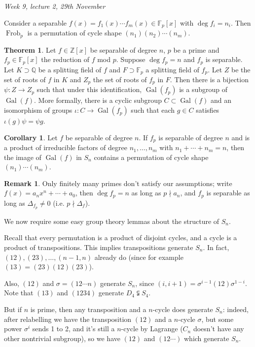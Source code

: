 \documentclass{article}
\newcommand{\F}{\mathbb{F}}
\newcommand{\Z}{\mathbb{Z}}
\newcommand{\Q}{\mathbb{Q}}
\newcommand{\Gal}{\operatorname{Gal}}
\newcommand{\Frob}{\operatorname{Frob}}
\theoremstyle{definition}
\newtheorem{thm}[defn]{Theorem}
\newtheorem{coro}[defn]{Corollary}
\newtheorem{remark}[defn]{Remark}
\begin{document}
\begin{flushright}
\textit{Week 9, lecture 2, 29th November}
\end{flushright}

Consider a separable $f(x)=f_1(x)\cdots f_m(x)\in\F_p[x]$ with $\deg f_i=n_i$. Then $\Frob_p$ is a permutation of cycle shape $(n_1)(n_2)\cdots (n_m)$.

\begin{thm}
Let $f\in\Z[x]$ be separable of degree $n$, $p$ be a prime and $f_p\in\F_p[x]$ the reduction of $f$ mod $p$. Suppose $\deg f_p=n$ and $f_p$ is separable. Let $K\supset\Q$ be a splitting field of $f$ and $F\supset\F_p$ a splitting field of $f_p$. Let $Z$ be the set of roots of $f$ in $K$ and $Z_p$ the set of roots of $f_p$ in $F$. Then there is a bijection $\psi:Z\rightarrow Z_p$ such that under this identification, $\Gal(f_p)$ is a subgroup of $\Gal(f)$. More formally, there is a cyclic subgroup $C\subset\Gal(f)$ and an isomorphism of groups $\iota:C\rightarrow\Gal(f_p)$ such that each $g\in C$ satisfies $\iota(g)\psi=\psi g$.
\end{thm}

\begin{coro}
Let $f$ be separable of degree $n$. If $f_p$ is separable of degree $n$ and is a product of irreducible factors of degree $n_1,\ldots,n_m$ with $n_1+\cdots+n_m=n$, then the image of $\Gal(f)$ in $S_n$ contains a permutation of cycle shape $(n_1)\cdots (n_m)$.
\end{coro}

\begin{remark}
Only finitely many primes don't satisfy our assumptions; write $f(x)=a_nx^n+\cdots+a_0$, then $\deg f_p=n$ as long as $p\nmid a_n$, and $f_p$ is separable as long as $\Delta_{f_p}\neq 0$ (i.e. $p\nmid \Delta_f$).
\end{remark}

We now require some easy group theory lemmas about the structure of $S_n$.

Recall that every permutation is a product of disjoint cycles, and a cycle is a product of transpositions. This implies transpositions generate $S_n$. In fact, $(12),(23),\ldots,(n-1,n)$ already do (since for example $(13)=(23)(12)(23)$).

Also, $(12)$ and $\sigma=(12\cdots n)$ generate $S_n$, since $(i,i+1)=\sigma^{i-1}(12)\sigma^{1-i}$. Note that $(13)$ and $(1234)$ generate $D_4\subsetneqq S_4$.

But if $n$ is prime, then any transposition and a $n$-cycle does generate $S_n$: indeed, after relabelling we have the transposition $(12)$ and a $n$-cycle $\sigma$, but some power $\sigma^i$ sends 1 to 2, and it's still a $n$-cycle by Lagrange ($C_n$ doesn't have any other nontrivial subgroup), so we have $(12)$ and $(12\cdots)$ which generate $S_n$.
\end{document}
